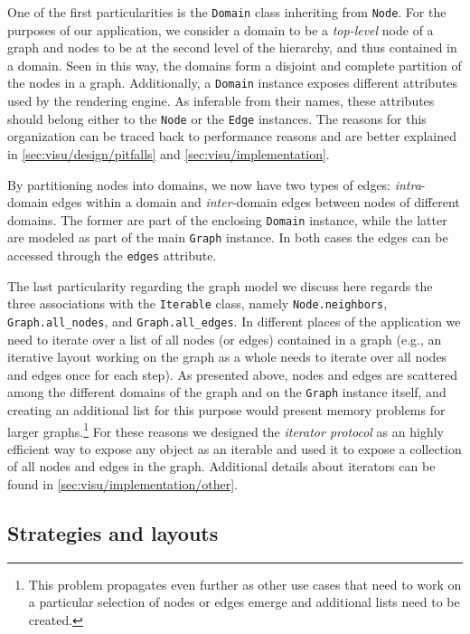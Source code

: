 One of the first particularities is the \texttt{Domain} class inheriting from \texttt{Node}. For the purposes of our application, we consider a domain to be a \emph{top-level} node of a graph and nodes to be at the second level of the hierarchy, and thus contained in a domain. Seen in this way, the domains form a disjoint and complete partition of the nodes in a graph. Additionally, a \texttt{Domain} instance exposes different attributes used by the rendering engine. As inferable from their names, these attributes should belong either to the \texttt{Node} or the \texttt{Edge} instances. The reasons for this organization can be traced back to performance reasons and are better explained in \vref{sec:visu/design/pitfalls} and \vref{sec:visu/implementation}.

By partitioning nodes into domains, we now have two types of edges: \emph{intra}-domain edges within a domain and \emph{inter-}domain edges between nodes of different domains. The former are part of the enclosing \texttt{Domain} instance, while the latter are modeled as part of the main \texttt{Graph} instance. In both cases the edges can be accessed through the \texttt{edges} attribute.

The last particularity regarding the graph model we discuss here regards the three associations with the \texttt{Iterable} class, namely \texttt{Node.neighbors}, \texttt{Graph.all\_nodes}, and \texttt{Graph.all\_edges}. In different places of the application we need to iterate over a list of all nodes (or edges) contained in a graph (e.g., an iterative layout working on the graph as a whole needs to iterate over all nodes and edges once for each step). As presented above, nodes and edges are scattered among the different domains of the graph and on the \texttt{Graph} instance itself, and creating an additional list for this purpose would present memory problems for larger graphs.\footnote{This problem propagates even further as other use cases that need to work on a particular selection of nodes or edges emerge and additional lists need to be created.} For these reasons we designed the \emph{iterator protocol} as an highly efficient way to expose any object as an iterable and used it to expose a collection of all nodes and edges in the graph. Additional details about iterators can be found in \vref{sec:visu/implementation/other}.


\subsection{Strategies and layouts}
\label{sec:visu/design/layout}

